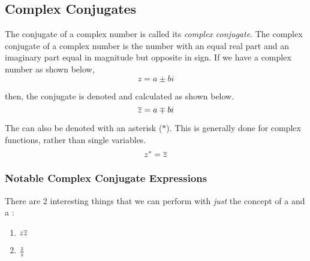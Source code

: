 \subsection{Complex Conjugates}\label{app:Complex_Conjugates}
\begin{definition}\label{def:Complex_Conjugate}
  The conjugate of a complex number is called its \emph{complex conjugate}.
  The complex conjugate of a complex number is the number with an equal real part and an imaginary part equal in magnitude but opposite in sign.
  If we have a complex number as shown below,
  \begin{equation*}
    z = a \pm bi
  \end{equation*}

  then, the conjugate is denoted and calculated as shown below.
  \begin{equation}\label{eq:Complex_Conjugates}
    \overline{z} = a \mp bi
  \end{equation}
\end{definition}

The  can also be denoted with an asterisk ($*$).
This is generally done for complex functions, rather than single variables.
\begin{equation}\label{eq:Complex_Conjugates_Asterisk}
  z^{*} = \overline{z}
\end{equation}

\subsubsection{Notable Complex Conjugate Expressions}\label{subsubsec:Complex_Conjugate_Notable_Expressions}
There are 2 interesting things that we can perform with \textit{just} the concept of a  and a :
\begin{enumerate}
\item $z \overline{z}$
\item $\frac{z}{\overline{z}}$
\end{enumerate}

